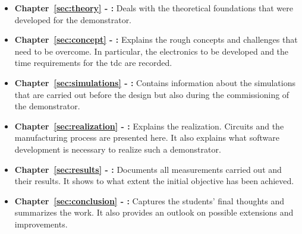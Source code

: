 \begin{itemize}
    \item \textbf{Chapter~\ref{sec:theory} - :} Deals with the theoretical foundations that were
          developed for the demonstrator.

    \item \textbf{Chapter~\ref{sec:concept} - :} Explains the rough concepts and challenges that
          need to be overcome. In particular, the electronics to be developed and the time requirements for the
          \acrshort{tdc} are recorded.

    \item \textbf{Chapter~\ref{sec:simulations} - :} Contains information about the
          simulations that are carried out before the design but also during the commissioning of the demonstrator.

    \item \textbf{Chapter~\ref{sec:realization} - :} Explains the realization. Circuits and
          the manufacturing process are presented here. It also explains what software development is necessary to
          realize such a demonstrator.

    \item \textbf{Chapter~\ref{sec:results} - :} Documents all measurements carried out and their
          results. It shows to what extent the initial objective has been achieved.

    \item \textbf{Chapter~\ref{sec:conclusion} - :} Captures the students' final thoughts and
          summarizes the work. It also provides an outlook on possible extensions and improvements.
\end{itemize}
